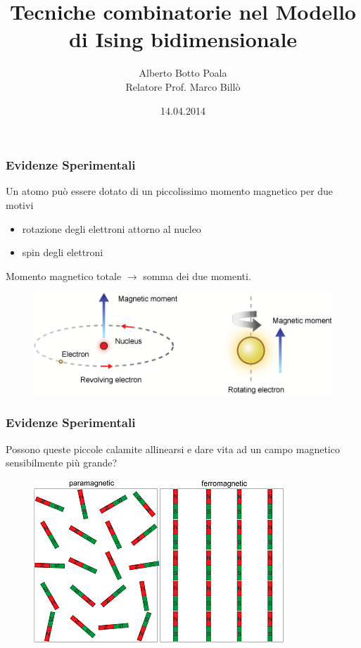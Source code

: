 \documentclass[11pt]{beamer}
\title{\textbf{Tecniche combinatorie nel Modello di Ising bidimensionale}}
\author{Alberto Botto Poala \\
Relatore Prof. Marco Billò}
\date{14.04.2014}
\begin{document}
\begin{frame}
 \maketitle
\end{frame}

\begin{frame}
	\frametitle{Evidenze Sperimentali}
Un atomo può essere dotato di un piccolissimo momento magnetico per due motivi
	\begin{itemize}
	\item{rotazione degli elettroni attorno al nucleo}
	\item{spin degli elettroni}
 	\end{itemize}
Momento magnetico totale $\to$ somma dei due momenti.\\
	\begin{figure}[h]
	\centering
	\includegraphics[width=0.9\columnwidth]{pt2}

	\label{fig1}
	\end{figure}
\end{frame}

\begin{frame}
	\frametitle{Evidenze Sperimentali}
Possono queste piccole calamite allinearsi e dare vita ad un campo magnetico sensibilmente più grande? 


\begin{figure}[r]
	\centering
	\includegraphics[width=0.6\columnwidth]{pt1}
		\label{fig1}
	\end{figure}

\end{frame}
\end{document}
